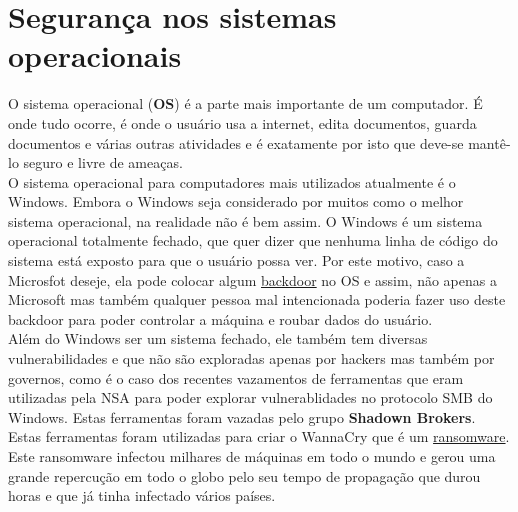 \documentclass[12pt, letterpaper, DejaVuSansMono:12]{report}
\begin{document}
\pagebreak

\section{Segurança nos sistemas operacionais}
	O sistema operacional (\textbf{OS}) é a parte mais importante de um computador. É onde tudo ocorre, é onde o usuário usa a internet, edita documentos, guarda documentos e várias outras atividades e é exatamente por isto que deve-se mantê-lo seguro e livre de ameaças.\\

	O sistema operacional para computadores mais utilizados atualmente é o Windows. Embora o Windows seja considerado por muitos como o melhor sistema operacional, na realidade não é bem assim. O Windows é um sistema operacional totalmente fechado, que quer dizer que nenhuma linha de código do sistema está exposto para que o usuário possa ver. Por este motivo, caso a Microsfot  deseje, ela pode colocar algum \href{https://criptowiki.miraheze.org/wiki/Backdoors}{backdoor} no OS e assim, não apenas a Microsoft mas também qualquer pessoa mal intencionada poderia fazer uso deste backdoor para poder controlar a máquina e roubar dados do usuário.\\

	Além do Windows ser um sistema fechado, ele também tem diversas vulnerabilidades e que não são exploradas apenas por hackers mas também por governos, como é o caso dos recentes vazamentos de ferramentas que eram utilizadas pela NSA para poder explorar vulnerablidades no protocolo SMB do Windows. Estas ferramentas foram vazadas pelo grupo \textbf{Shadown Brokers}. Estas ferramentas foram utilizadas para criar o WannaCry que é um \href{https://criptowiki.miraheze.org/wiki/Ransomwares}{ransomware}. Este ransomware infectou milhares de máquinas em todo o mundo e gerou uma grande repercução em todo o globo pelo seu tempo de propagação que durou horas e que já tinha infectado vários países.\\
\end{document}
